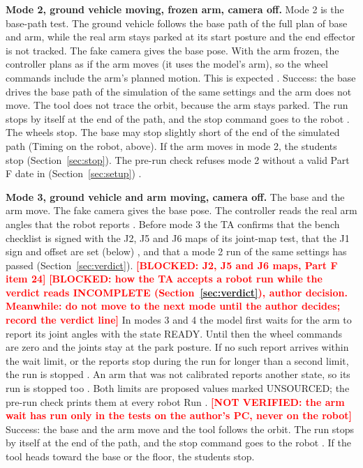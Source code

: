 \documentclass[11pt]{article}
\newcommand{\todo}[1]{\textcolor{red}{\textbf{[#1]}}}
\newcommand{\cmd}[1]{\texttt{\romecode{#1}}}
\newif\ifshowsrc
\newcommand{\src}[1]{\ifshowsrc{\scriptsize\,[\texttt{\romecode{#1}}]}\fi}
\begin{document}
\textbf{Mode 2, ground vehicle moving, frozen arm, camera off.} Mode 2 is the base-path test. The ground vehicle follows
the base path of the full plan of base and arm, while the real arm stays parked at its start posture and the end
effector is not tracked. The fake camera gives the base pose. With the arm frozen, the controller plans as if the arm
moves (it uses the model's arm), so the wheel commands include the arm's planned motion. This is expected
\src{tools/wire_motive_emulator.m:70; tests/test_motive_emulator.m:61-62}.
Success: the base drives the base path of the simulation of the same settings and the
arm does not move. The tool does not trace the orbit, because the arm stays parked. The run stops
by itself at the end of the path, and the stop command goes to the robot
\src{ROMECommand.m:197-200}. The wheels stop. The base may stop slightly short of the end of
the simulated path (Timing on the robot, above). If the arm moves in mode 2, the students stop
(Section~\ref{sec:stop}).
The pre-run check refuses mode 2 without a valid Part F date in \cmd{signoff_partF} (Section~\ref{sec:setup})
\src{prerun_check_core.m:153-160}.

\textbf{Mode 3, ground vehicle and arm moving, camera off.} The base and the arm move. The fake camera gives the base
pose. The controller reads the real arm angles that the robot reports \src{tools/wire_motive_emulator.m:70}. Before
mode 3 the TA confirms that the bench checklist is signed with the J2, J5 and J6 maps of its joint-map test, that the
J1 sign and offset are set (below)
\src{docs/lab/PART_F_BENCH_CHECKLIST.md:180; docs/lab/PART_F_BENCH_CHECKLIST.md:192}, and that a mode 2 run of the same
settings has passed (Section~\ref{sec:verdict}).
\todo{BLOCKED: J2, J5 and J6 maps, Part F item 24}
\todo{BLOCKED: how the TA accepts a robot run while the verdict reads INCOMPLETE (Section~\ref{sec:verdict}), author decision. Meanwhile: do not move to the next mode until the author decides; record the verdict line}
In modes 3 and 4 the model first waits for the arm to report its joint angles with the state READY. Until then the
wheel commands are zero and the joints stay at the park posture. If no such report arrives within the wait limit, or
the reports stop during the run for longer than a second limit, the run is stopped
\src{arm_ready_core.m:34-36; arm_ready_core.m:43-49; run_gate_block.m:7-11; joint_gate_block.m:11-15}. An arm that was
not calibrated reports another state, so its run is stopped too \src{arm_ready_core.m:48-49}. Both limits are proposed
values marked UNSOURCED; the pre-run check prints them at every robot Run
\src{allowed_ranges.m:148-153; prerun_check.m:95-96}.
\todo{NOT VERIFIED: the arm wait has run only in the tests on the author's PC, never on the robot}
Success: the base and the arm move and the tool follows the orbit. The run stops by
itself at the end of the path, and the stop command goes to the robot \src{ROMECommand.m:197-200}. If the tool heads
toward the base or the floor, the students stop.
\end{document}
